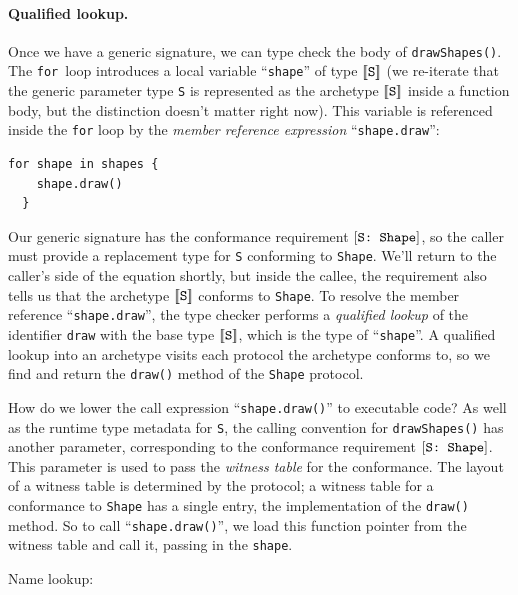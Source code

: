 \documentclass[../generics]{subfiles}
\begin{document}
\paragraph{Qualified  lookup.}
Once we have a generic signature, we can type check the body of \verb|drawShapes()|. The \texttt{for}~loop introduces a local variable ``\texttt{shape}'' of type $[\![\texttt{S}]\!]$ (we re-iterate that the generic parameter type \texttt{S} is represented as the archetype $[\![\texttt{S}]\!]$ inside a function body, but the distinction doesn't matter right now). This variable is referenced inside the \texttt{for} loop by the \emph{member reference expression} ``\texttt{shape.draw}'':
\begin{Verbatim}[firstnumber=6]
  for shape in shapes {
    shape.draw()
  }
\end{Verbatim}

Our generic signature has the conformance requirement $[\texttt{S:~Shape}]$, so the caller must provide a replacement type for \texttt{S} conforming to \texttt{Shape}. We'll return to the caller's side of the equation shortly, but inside the callee, the requirement also tells us that the archetype $[\![\texttt{S}]\!]$ conforms to \texttt{Shape}. To resolve the member reference ``\texttt{shape.draw}'', the type checker performs a \emph{qualified lookup} of the identifier \texttt{draw} with the base type $[\![\texttt{S}]\!]$, which is the type of ``\texttt{shape}''. A qualified lookup into an archetype visits each protocol the archetype conforms to, so we find and return the \texttt{draw()} method of the \texttt{Shape} protocol.

How do we lower the call expression ``\texttt{shape.draw()}'' to executable code? As well as the runtime type metadata for \texttt{S}, the calling convention for \verb|drawShapes()| has another parameter, corresponding to the conformance requirement $[\texttt{S:~Shape}]$. This parameter is used to pass the \emph{witness table} for the conformance. The layout of a witness table is determined by the protocol; a witness table for a conformance to \texttt{Shape} has a single entry, the implementation of the \texttt{draw()} method. So to call ``\texttt{shape.draw()}'', we load this function pointer from the witness table and call it, passing in the \texttt{shape}.

\begin{MoreDetails}
\item Name lookup: 
\end{MoreDetails}
\end{document}
